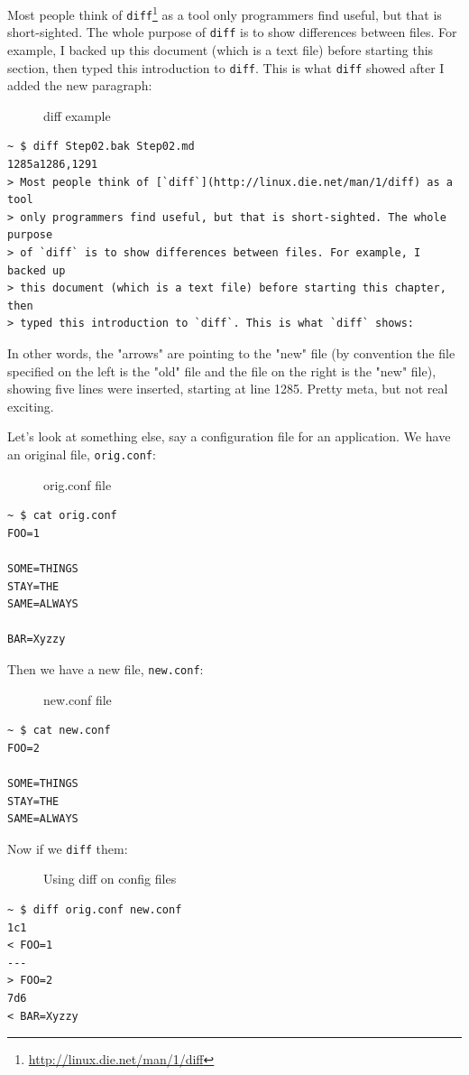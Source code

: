 \documentclass[10pt,]{book}
\renewcommand{\href}[2]{#2\footnote{\url{#1}}}
\numberwithin{figure}{chapter}
\DeclareRobustCommand{\drcap}[1]{\begin{figure}[H]\caption{#1}\end{figure}}
\DeclareRobustCommand{\drcmd}[1]{\index{Commands!#1}}
\begin{document}
Most people think of
\href{http://linux.die.net/man/1/diff}{\texttt{diff}}\drcmd{diff} as a
tool only programmers find useful, but that is short-sighted. The whole
purpose of \texttt{diff} is to show differences between files. For
example, I backed up this document (which is a text file) before
starting this section, then typed this introduction to \texttt{diff}.
This is what \texttt{diff} showed after I added the new paragraph:

\drcap{diff example}

\begin{verbatim}
~ $ diff Step02.bak Step02.md
1285a1286,1291
> Most people think of [`diff`](http://linux.die.net/man/1/diff) as a tool
> only programmers find useful, but that is short-sighted. The whole purpose
> of `diff` is to show differences between files. For example, I backed up
> this document (which is a text file) before starting this chapter, then
> typed this introduction to `diff`. This is what `diff` shows:
\end{verbatim}

In other words, the "arrows" are pointing to the "new" file (by
convention the file specified on the left is the "old" file and the file
on the right is the "new" file), showing five lines were inserted,
starting at line 1285. Pretty meta, but not real exciting.

Let's look at something else, say a configuration file for an
application. We have an original file, \texttt{orig.conf}:

\drcap{orig.conf file}

\begin{verbatim}
~ $ cat orig.conf
FOO=1

SOME=THINGS
STAY=THE
SAME=ALWAYS

BAR=Xyzzy
\end{verbatim}

Then we have a new file, \texttt{new.conf}:

\drcap{new.conf file}

\begin{verbatim}
~ $ cat new.conf
FOO=2

SOME=THINGS
STAY=THE
SAME=ALWAYS
\end{verbatim}

Now if we \texttt{diff} them:

\drcap{Using diff on config files}

\begin{verbatim}
~ $ diff orig.conf new.conf
1c1
< FOO=1
---
> FOO=2
7d6
< BAR=Xyzzy
\end{verbatim}
\end{document}
